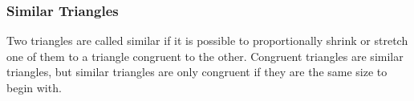             \subsubsection{ Similar Triangles}
            \nopagebreak
          \label{m39368*eip-665}Two triangles are called similar if it is possible to proportionally shrink or stretch one of them to a triangle congruent to the other. Congruent triangles are similar triangles, but similar triangles are only congruent if they are the same size to begin with.\par 
    \setlength\mytablespace{4\tabcolsep}
    \addtolength\mytablespace{3\arrayrulewidth}
    \setlength\mytablewidth{\linewidth}
    \setlength\mytableroom{\mytablewidth}
    \addtolength\mytableroom{-\mytablespace}
    \setlength\myfixedwidth{0pt}
    \setlength\mystarwidth{\mytableroom}
        \addtolength\mystarwidth{-\myfixedwidth}
        \divide{}
